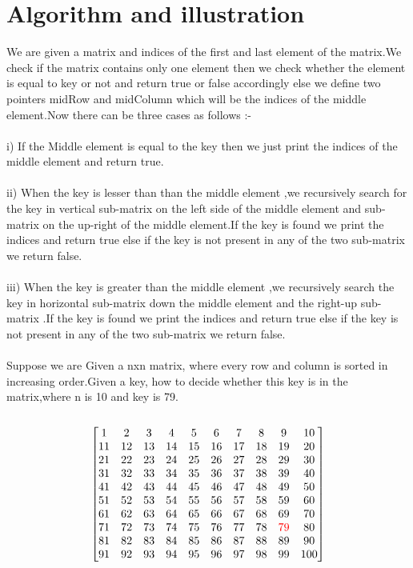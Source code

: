 \documentclass[conference]{IEEEtran}
\begin{document}
\section{Algorithm and illustration}
We are given a matrix and indices of the first and last element of the matrix.We check if the matrix contains only one element then we check whether the element is equal to key or not and return true or false accordingly else we define two pointers midRow and midColumn which will be the indices of the middle element.Now there can be three cases as follows :- \\  \\
i) If the Middle element is equal to the key then we just print the indices of the middle element and return true.\\ \\
ii) When the key is lesser than than the middle element ,we recursively search for the key in vertical sub-matrix on the left side of the middle element and sub-matrix on the up-right of the middle element.If the key is found we print the indices and return true else if the key is not present in any of the two sub-matrix we return false. \\ \\
iii) When the key is greater than the middle element ,we recursively search the key in horizontal sub-matrix down the middle element and the right-up sub-matrix .If the key is found we print the indices and return true else if the key is not present in any of the two sub-matrix we return false. \\ \\

Suppose we are Given a nxn matrix, where every row and column is sorted in  increasing  order.Given  a  key,  how  to  decide  whether this key is in the matrix,where n is 10 and key is 79. \\ \\

$$
\begin{bmatrix}
1 & 2 & 3 & 4 & 5 & 6 & 7 & 8 & 9 & 10 \\
11 & 12 & 13 & 14 & 15 & 16 & 17 & 18 & 19 & 20 \\
21 & 22 & 23 & 24 & 25 & 26 & 27 & 28 & 29 & 30 \\
31 & 32 & 33 & 34 & 35 & 36 & 37 & 38 & 39 & 40 \\
41 & 42 & 43 & 44 & 45 & 46 & 47 & 48 & 49 & 50 \\
51 & 52 & 53 & 54 & 55 & 56 & 57 & 58 & 59 & 60 \\
61 & 62 & 63 & 64 & 65 & 66 & 67 & 68 & 69 & 70 \\
71 & 72 & 73 & 74 & 75 & 76 & 77 & 78 & \color{red}79 & 80 \\
81 & 82 & 83 & 84 & 85 & 86 & 87 & 88 & 89 & 90 \\
91 & 92 & 93 & 94 & 95 & 96 & 97 & 98 & 99 & 100 \\ 
\end{bmatrix}
$$
\\
\end{document}
